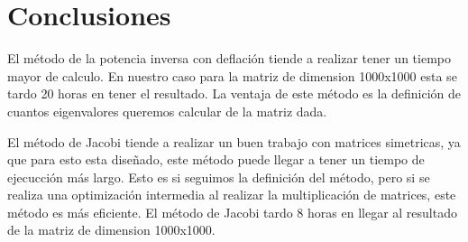 \section{Conclusiones}

El método de la potencia inversa con deflación tiende a realizar tener un tiempo mayor de calculo. En nuestro caso para la matriz de dimension 1000x1000 esta se tardo 20 horas en tener el resultado. La ventaja de este método es la definición de cuantos eigenvalores queremos calcular de la matriz dada.

El método de Jacobi tiende a realizar un buen trabajo con matrices simetricas, ya que para esto esta diseñado, este método puede llegar a tener un tiempo de ejecucción más largo. Esto es si seguimos la definición del método, pero si se realiza una optimización intermedia al realizar la multiplicación de matrices, este método es más eficiente. El método de Jacobi tardo 8 horas en llegar al resultado de la matriz de dimension 1000x1000.